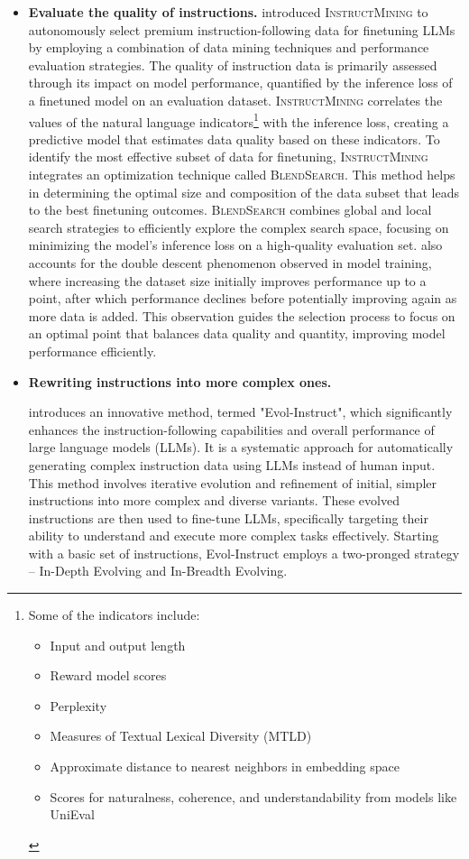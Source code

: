 \begin{itemize}
{	      }
	\item \textbf{Evaluate the quality of instructions.}{
		      \textcite{cao2023instruction} introduced \textsc{InstructMining} to autonomously select premium instruction-following data for finetuning LLMs by employing a combination of data mining techniques and performance evaluation strategies.
		      The quality of instruction data is primarily assessed through its impact on model performance, quantified by the inference loss of a finetuned model on an evaluation dataset. \textsc{InstructMining} correlates the values of the natural language indicators\footnote{Some of the indicators include:
			      \begin{itemize}
				      \item Input and output length
				      \item Reward model scores
				      \item Perplexity
				      \item Measures of Textual Lexical Diversity (MTLD)
				      \item Approximate distance to nearest neighbors in embedding space
				      \item Scores for naturalness, coherence, and understandability from models like UniEval
			      \end{itemize}
		      }
		      with the inference loss, creating a predictive model that estimates data quality based on these indicators.
		      To identify the most effective subset of data for finetuning, \textsc{InstructMining} integrates an optimization technique called \textsc{BlendSearch}. This method helps in determining the optimal size and composition of the data subset that leads to the best finetuning outcomes. \textsc{BlendSearch} combines global and local search strategies to efficiently explore the complex search space, focusing on minimizing the model’s inference loss on a high-quality evaluation set.
		      \textcite{cao2023instruction} also accounts for the double descent phenomenon observed in model training, where increasing the dataset size initially improves performance up to a point, after which performance declines before potentially improving again as more data is added. This observation guides the selection process to focus on an optimal point that balances data quality and quantity, improving model performance efficiently.
	      }
	\item \textbf{Rewriting instructions into more complex ones.} {
		      \textcite{xu2023wizardlm} introduces an innovative method, termed "Evol-Instruct", which significantly enhances the instruction-following capabilities and overall performance of large language models (LLMs). It is a systematic approach for automatically generating complex instruction data using LLMs instead of human input. This method involves iterative evolution and refinement of initial, simpler instructions into more complex and diverse variants. These evolved instructions are then used to fine-tune LLMs, specifically targeting their ability to understand and execute more complex tasks effectively. Starting with a basic set of instructions, Evol-Instruct employs a two-pronged strategy -- In-Depth Evolving and In-Breadth Evolving.

}
\end{itemize}
